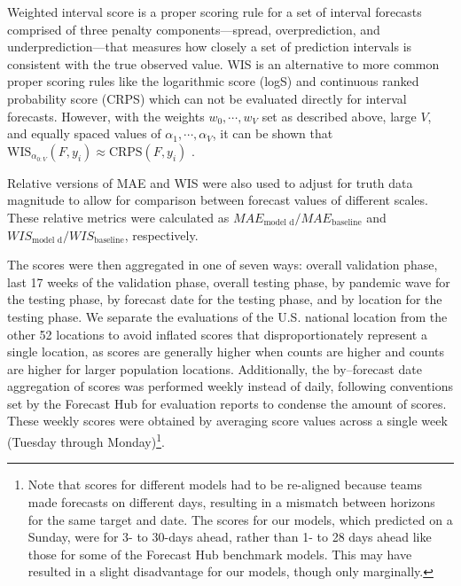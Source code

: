 \documentclass[12pt]{article}
\begin{document}
Weighted interval score is a proper scoring rule for a set of interval forecasts comprised of three penalty components---spread, overprediction, and underprediction---that measures how closely a set of prediction intervals is consistent with the true observed value. WIS is an alternative to more common proper scoring rules like the logarithmic score (logS) and continuous ranked probability score (CRPS) which can not be evaluated directly for interval forecasts. However, with the weights $w_0, \cdots, w_V$ set as described above, large $V$, and equally spaced values of $\alpha_1, \cdots, \alpha_V$, it can be shown that $\textrm{WIS}_{\alpha_{0:V}}(F, y_i) \approx \textrm{CRPS}(F, y_i)$ \cite{int_eval}.

Relative versions of MAE and WIS were also used to adjust for truth data magnitude to allow for comparison between forecast values of different scales. These relative metrics were calculated as $MAE_{\textrm{model d}} / MAE_{\textrm{baseline}}$ and $WIS_{\textrm{model d}} /WIS_{\textrm{baseline}}$, respectively\cite{cramer}.

The scores were then aggregated in one of seven ways: overall validation phase, last 17 weeks of the validation phase, overall testing phase, by pandemic wave for the testing phase, by forecast date for the testing phase, and by location for the testing phase. We separate the evaluations of the U.S. national location from the other 52 locations to avoid inflated scores that disproportionately represent a single location, as scores are generally higher when counts are higher and counts are higher for larger population locations. Additionally, the by--forecast date aggregation of scores was performed weekly instead of daily, following conventions set by the Forecast Hub for evaluation reports to condense the amount of scores. These weekly scores were obtained by averaging score values across a single week (Tuesday through Monday)\cite{eval_reports}\footnote{Note that scores for different models had to be re-aligned because teams made forecasts on different days, resulting in a mismatch between horizons for the same target and date. The scores for our models, which predicted on a Sunday, were for 3- to 30-days ahead, rather than 1- to 28 days ahead like those for some of the Forecast Hub benchmark models. This may have resulted in a slight disadvantage for our models, though only marginally.}.
\end{document}

